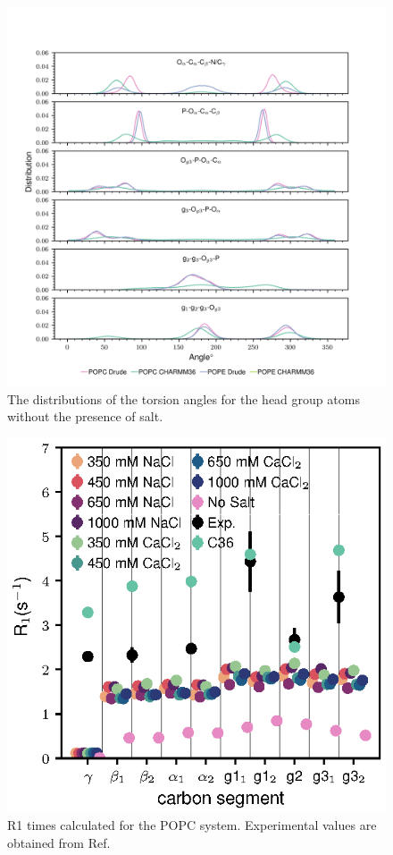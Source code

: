 \documentclass[journal=jacsat,manuscript=article,layout=singlecolumn]{achemso}
\begin{document}
\begin{figure}[!hbt]
	\centering
	\includegraphics{dihedral_distributions_no_salt.png}
	\caption{The distributions of the torsion angles for the head group atoms without the presence of salt.}
	\label{fig:dihedral_no_salt}
\end{figure}

\begin{figure}[!hbt]
	\centering
	\includegraphics{correlation_times.eps}
	\caption{R1 times calculated for the POPC system. Experimental values are obtained from Ref.~\cite{antila2020quasi}}
	\label{fig:correlation_times}
\end{figure}
\end{document}
